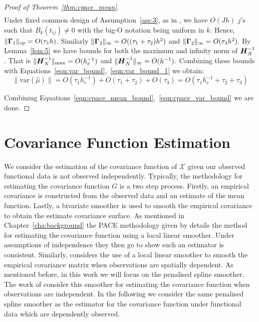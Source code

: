 \begin{proof}[Proof of Theorem~\ref{thm:cpace_mean}]
\begin{equation}
\begin{split}
	\end{split}
\label{eqn:var_bound}
\end{equation}
Under fixed common design of Assumption~\ref{ass:3}, as in \citep{xiao_asymptotic_2020}, we have $O(Jh)$ $j$'s such that $B_k(t_{ij}) \ne 0$ with the big-O notation being uniform in $k$.
Hence, $\lVert \bm{{\Gamma}}_{1}\rVert_{\text{op}}= O(\tau_1 h)$.
Similarly $\lVert \bm{{\Gamma}}_{2} \rVert_{\infty} = O(( \tau_1 + \tau_2 ) h^2)$ and $\lVert \bm{{\Gamma}}_{2}\rVert_{\infty} = O(\tau_3 h^2)$. 
By Lemma~\ref{lem:5} we have bounds for both the maximum and infinity norm of $\bm{{H}}_{N}^{-1}$.
That is $\lVert \bm{{H}}_{N}^{-1} \rVert_\text{max} = O(h_e^{-1})$ and $\lVert \bm{{H}}_{N}^{-1} \rVert_\infty= O(h^{-1})$.
Combining these bounds with Equations~\ref{eqn:var_bound},~\ref{eqn:var_bound_1} we obtain: 
\begin{equation}
	\lVert \text{var}\left(\hat{\mu}\right) \rVert = O(\tau_1 h_e^{-1}) + O(\tau_1 + \tau_2) + O(\tau_3) = O(\tau_1 h_e^{-1} + \tau_2 + \tau_3)
	\label{eqn:cpace_var_bound}
\end{equation}

Combining Equations~\ref{eqn:cpace_mean_bound},~\ref{eqn:cpace_var_bound} we are done.
\end{proof}

\section{Covariance Function Estimation \label{sec:cpace_eigen_estim}}
We consider the estimation of the covariance function of $\mathcal{X}$ given our observed functional data is not observed independently.
Typically, the methodology for estimating the covariance function $G$ is a two step process.
Firstly, an empirical covariance is constructed from the observed data and an estimate of the mean function.
Lastly, a bivariate smoother is used to smooth the empirical covariance to obtain the estimate covariance surface. 
As mentioned in Chapter~\ref{cha:background} the PACE methodology given by \citep{yao_functional_2005} details the method for estimating the covariance function using a local linear smoother. 
Under assumptions of independence they then go to show such an estimator is consistent.
Similarly, \citep{liu_functional_2017} considers the use of a local linear smoother to smooth the empirical covariance matrix when observations are spatially dependent.
As mentioned before, in this work we will focus on the penalised spline smoother. 
The work of \citep{xiao_asymptotic_2020} consider this smoother for estimating the covariance function when observations are independent. 
In the following we consider the same penalised spline smoother as the estimator for the covariance function under functional data which are dependently observed.

